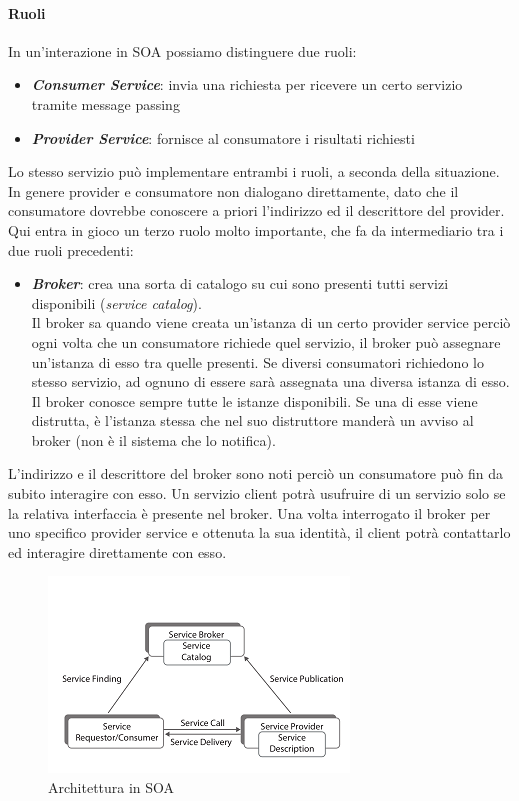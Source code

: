 \documentclass{article}
\begin{document}
\paragraph{Ruoli}
In un’interazione in SOA possiamo distinguere due  ruoli:
\begin{itemize}
    \item \textbf{\textit{Consumer Service}}:  invia una richiesta per ricevere un certo servizio tramite message passing
	\item \textbf{\textit{Provider Service}}:  fornisce al consumatore i risultati richiesti
\end{itemize}
Lo stesso servizio può implementare entrambi i ruoli, a seconda della situazione. \\In genere provider e consumatore non dialogano direttamente, dato che il consumatore dovrebbe conoscere a priori l'indirizzo ed il descrittore del provider. Qui entra in gioco un terzo ruolo molto importante, che fa da intermediario tra i due ruoli precedenti:
\begin{itemize}
    \item \textbf{\textit{Broker}}: crea una sorta di catalogo su cui sono presenti tutti servizi disponibili (\textit{service catalog}).  \\ Il broker sa quando viene creata un'istanza di un certo provider service perciò ogni volta che un consumatore richiede quel servizio, il broker può assegnare un'istanza di esso tra quelle presenti. Se diversi consumatori richiedono lo stesso servizio, ad ognuno di essere sarà assegnata una diversa istanza di esso.
    Il broker conosce sempre tutte le istanze disponibili. Se una di esse viene distrutta, è l'istanza stessa che nel suo distruttore manderà un avviso al broker (non è il sistema che lo notifica).
\end{itemize}
L'indirizzo e il descrittore del broker sono noti perciò un consumatore può fin da subito interagire con esso. Un servizio client potrà usufruire di un servizio solo se la relativa interfaccia è presente nel broker. Una volta interrogato il broker per uno specifico provider service e ottenuta la sua identità, il client potrà contattarlo ed interagire direttamente con esso.
\begin{figure}[H]
\centering
\includegraphics{img/broker_Arch.png}
\caption{Architettura in SOA}
\end{figure}
\end{document}
